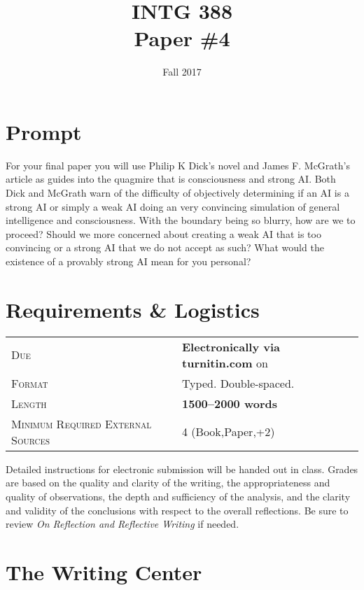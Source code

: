 \documentclass[]{tufte-handout}
\title{INTG 388 \\ Paper \#4 }
\date{ Fall 2017 }
\begin{document}
\maketitle

\section{Prompt}

For your final paper you will use Philip K Dick's novel\citep{dick_androids_2008} and James F. McGrath's article\citep{mcgrath_religion_2011} as guides into the quagmire that is consciousness and strong AI\@. Both Dick and McGrath warn of the difficulty of objectively determining if an AI is a strong AI or simply a weak AI doing an very convincing simulation of general intelligence and consciousness. With the boundary being so blurry, how are we to proceed? Should we more concerned about creating a weak AI that is too convincing or a strong AI that we do not accept as such? What would the existence of a provably strong AI mean for you personal? 

\section{Requirements \& Logistics}

\begin{tabular}{ll}
\textsc{Due} & \textbf{Electronically via turnitin.com} on   \\
\textsc{Format} & Typed. Double-spaced. \\
\textsc{Length} & \textbf{1500--2000 words} \\
\textsc{Minimum Required External Sources} & 4 (Book,Paper,+2)
\end{tabular}


\vspace{.1in}

Detailed instructions for electronic submission will be handed out in class. Grades are based on the quality and clarity of the writing, the appropriateness and quality of observations, the depth and sufficiency of the analysis, and the clarity and validity of the conclusions with respect to the overall reflections. Be sure to review \textit{On Reflection and Reflective Writing} if needed.

\section{The Writing Center}
\end{document}
